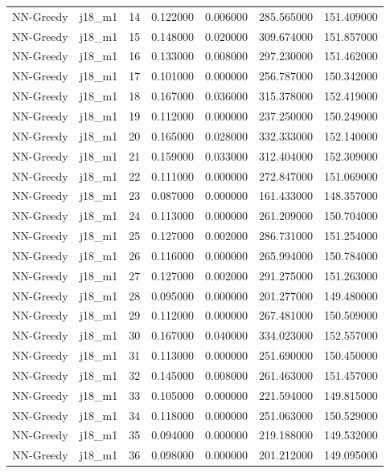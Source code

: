 \begin{tabular}{llrrrrr}
NN-Greedy & j18_m1 & 14 & 0.122000 & 0.006000 & 285.565000 & 151.409000 \\
NN-Greedy & j18_m1 & 15 & 0.148000 & 0.020000 & 309.674000 & 151.857000 \\
NN-Greedy & j18_m1 & 16 & 0.133000 & 0.008000 & 297.230000 & 151.462000 \\
NN-Greedy & j18_m1 & 17 & 0.101000 & 0.000000 & 256.787000 & 150.342000 \\
NN-Greedy & j18_m1 & 18 & 0.167000 & 0.036000 & 315.378000 & 152.419000 \\
NN-Greedy & j18_m1 & 19 & 0.112000 & 0.000000 & 237.250000 & 150.249000 \\
NN-Greedy & j18_m1 & 20 & 0.165000 & 0.028000 & 332.333000 & 152.140000 \\
NN-Greedy & j18_m1 & 21 & 0.159000 & 0.033000 & 312.404000 & 152.309000 \\
NN-Greedy & j18_m1 & 22 & 0.111000 & 0.000000 & 272.847000 & 151.069000 \\
NN-Greedy & j18_m1 & 23 & 0.087000 & 0.000000 & 161.433000 & 148.357000 \\
NN-Greedy & j18_m1 & 24 & 0.113000 & 0.000000 & 261.209000 & 150.704000 \\
NN-Greedy & j18_m1 & 25 & 0.127000 & 0.002000 & 286.731000 & 151.254000 \\
NN-Greedy & j18_m1 & 26 & 0.116000 & 0.000000 & 265.994000 & 150.784000 \\
NN-Greedy & j18_m1 & 27 & 0.127000 & 0.002000 & 291.275000 & 151.263000 \\
NN-Greedy & j18_m1 & 28 & 0.095000 & 0.000000 & 201.277000 & 149.480000 \\
NN-Greedy & j18_m1 & 29 & 0.112000 & 0.000000 & 267.481000 & 150.509000 \\
NN-Greedy & j18_m1 & 30 & 0.167000 & 0.040000 & 334.023000 & 152.557000 \\
NN-Greedy & j18_m1 & 31 & 0.113000 & 0.000000 & 251.690000 & 150.450000 \\
NN-Greedy & j18_m1 & 32 & 0.145000 & 0.008000 & 261.463000 & 151.457000 \\
NN-Greedy & j18_m1 & 33 & 0.105000 & 0.000000 & 221.594000 & 149.815000 \\
NN-Greedy & j18_m1 & 34 & 0.118000 & 0.000000 & 251.063000 & 150.529000 \\
NN-Greedy & j18_m1 & 35 & 0.094000 & 0.000000 & 219.188000 & 149.532000 \\
NN-Greedy & j18_m1 & 36 & 0.098000 & 0.000000 & 201.212000 & 149.095000 \\

\end{tabular}

